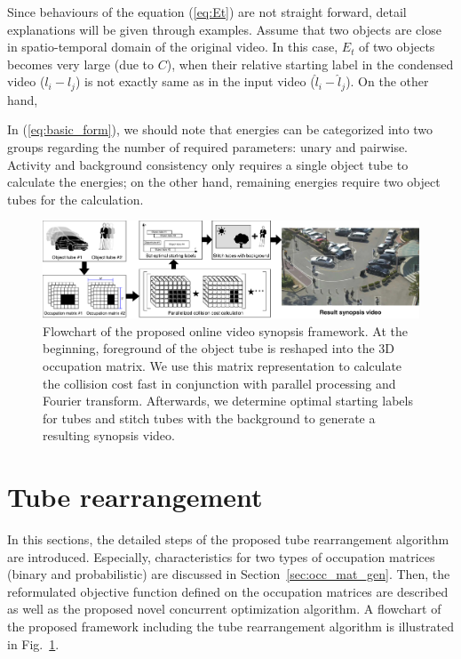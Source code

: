 \documentclass[11pt]{hyu_thesis}
\begin{document}
Since behaviours of the equation (\ref{eq:Et}) are not straight forward, detail explanations will be given through examples. Assume that two objects are close in spatio-temporal domain of the original video. In this case, $E_t$ of two objects becomes very large (due to $C$), when their relative starting label in the condensed video ($l_i - l_j$) is not exactly same as in the input video ($\hat{l}_i - \hat{l}_j$). On the other hand, 

In (\ref{eq:basic_form}), we should note that energies can be categorized into two groups regarding the number of required parameters: unary and pairwise. Activity and background consistency only requires a single object tube to calculate the energies; on the other hand, remaining energies require two object tubes for the calculation.

\begin{figure}
\begin{center}
\includegraphics[width=\linewidth]{flowchart.png}
\end{center}
\caption{Flowchart of the proposed online video synopsis framework. At the beginning, foreground of the object tube is reshaped into the 3D occupation matrix. We use this matrix representation to calculate the collision cost fast in conjunction with parallel processing and Fourier transform. Afterwards, we determine optimal starting labels for tubes and stitch tubes with the background to generate a resulting synopsis video.}
\label{fig:flowchart}
\end{figure}

\section{Tube rearrangement}
\label{sec:rearr}
In this sections, the detailed steps of the proposed tube rearrangement algorithm are introduced. Especially, characteristics for two types of occupation matrices (binary and probabilistic) are discussed in Section~\ref{sec:occ_mat_gen}. Then, the reformulated objective function defined on the occupation matrices are described as well as the proposed novel concurrent optimization algorithm. A flowchart of the proposed framework including the tube rearrangement algorithm is illustrated in Fig.~\ref{fig:flowchart}.
\end{document}
